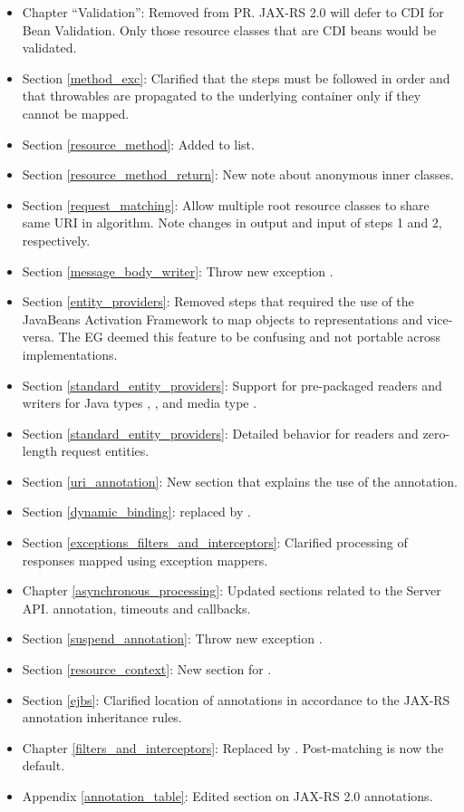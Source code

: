 \begin{itemize}
\item Chapter ``Validation'': Removed from PR. JAX-RS 2.0 will defer to CDI for Bean Validation. Only those resource classes that are CDI beans would be validated.
\item Section \ref{method_exc}: Clarified that the steps must be followed in order and that throwables are propagated to the underlying container only if they cannot be mapped.
\item Section \ref{resource_method}: Added  to list.
\item Section \ref{resource_method_return}: New note about anonymous inner classes.
\item Section \ref{request_matching}: Allow multiple root resource classes to share same URI in algorithm. Note changes in output and input of steps 1 and 2, respectively.
\item Section \ref{message_body_writer}: Throw new exception  .
\item Section \ref{entity_providers}: Removed steps that required the use of the JavaBeans Activation Framework\cite{jaf} to map objects to representations and vice-versa. The EG deemed this feature to be confusing and not portable across implementations.
\item Section \ref{standard_entity_providers}: Support for pre-packaged readers and writers for Java types , ,  and media type .
\item Section \ref{standard_entity_providers}: Detailed behavior for readers and zero-length request entities.
\item Section \ref{uri_annotation}: New section that explains the use of the  annotation.
\item Section \ref{dynamic_binding}:  replaced by .
\item Section \ref{exceptions_filters_and_interceptors}: Clarified processing of responses mapped using exception mappers. 
\item Chapter \ref{asynchronous_processing}: Updated sections related to the Server API.  annotation, timeouts and callbacks.
\item Section \ref{suspend_annotation}: Throw new exception .
\item Section \ref{resource_context}: New section for .
\item Section \ref{ejbs}: Clarified location of annotations in accordance to the JAX-RS annotation inheritance rules.
\item Chapter \ref{filters_and_interceptors}: Replaced  by . Post-matching is now the default.
\item Appendix \ref{annotation_table}: Edited section on JAX-RS 2.0 annotations.
\end{itemize}


